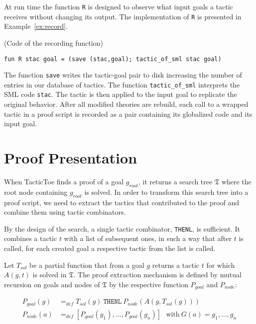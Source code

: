 \documentclass[runningheads,a4paper,draft]{svjour3}
\def\sml{\textsf{SML}\xspace}
\def\tactictoe{\textsf{TacticToe}\xspace}
\begin{document}
At run time the function \texttt{R} is designed to observe what input goals a
tactic  receives without changing its output. The implementation of \texttt{R} 
is presented in Example~\ref{ex:record}.

\begin{example}\label{ex:record} (Code of the recording function)
\begin{lstlisting}[language=SMLSmall]
fun R stac goal = (save (stac,goal); tactic_of_sml stac goal)
\end{lstlisting}
\end{example} 

The function \texttt{save} writes the tactic-goal pair to disk increasing the 
number of entries in our database of tactics. The function 
\texttt{tactic\_of\_sml} interprets the \sml code \texttt{stac}. The tactic is 
then applied to the input goal to replicate the original behavior.
After all modified theories are rebuild, each call to a wrapped tactic in a
proof script is recorded as a pair containing its globalized code and its 
input goal.

                                 
                        
\section{Proof Presentation}\label{sec:proofdisplay}

When \tactictoe finds a proof of a goal $g_{root}$, it returns a search tree 
$\mathfrak{T}$ where the root node containing $g_{root}$ is solved.
In order to transform this search tree into a proof script, we need to extract 
the tactics that contributed to the proof and combine them using tactic 
combinators.

By the design of the search, a single tactic combinator, \texttt{THENL}, is 
sufficient. It combines a tactic $t$ with a list of subsequent ones, in such a 
way that after $t$ is called, for each created goal a respective 
tactic from the list is called.

Let $T_{sol}$ be a partial function that from a goal $g$ returns a tactic $t$ 
for which $A(g,t)$ is solved in $\mathfrak{T}$.
The proof extraction mechanism is defined by mutual 
recursion on goals and nodes of $\mathfrak{T}$ by the respective function 
$P_{goal}$ and $P_{node}$:

\begin{align*}
P_{goal}(g) &=_{def} T_{sol}(g)\ \texttt{THENL}\ P_{node}(A(g,T_{sol}(g)))\\
P_{node}(a) &=_{def} [P_{goal}(g_1),\ldots,P_{goal}(g_n)]\ \ \ \text{with}\ 
G(a) = g_1,\ldots,g_n\\
\end{align*}
\end{document}
